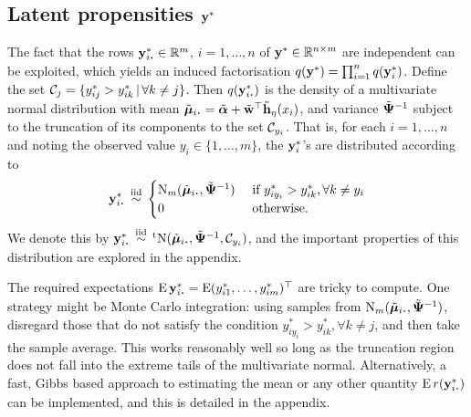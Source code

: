 \subsection{Latent propensities \texorpdfstring{${\mathbf y}^*$}{$y^*$}}

The fact that the rows $\by_{i \bigcdot}^* \in \bbR^m$, $i=1,\dots,n$ of ${\mathbf y}^* \in \mathbb{R}^{n \times m}$ are independent can be exploited, which yields an induced factorisation $q({\mathbf y}^*) = \prod_{i=1}^n q({\mathbf y}_i^*)$.
Define the set ${\mathcal C}_j = \{y_{ij}^* > y_{ik}^* \,|\, \forall k\neq j \}$.
Then $q(\by_{i \bigcdot}^*)$ is the density of a multivariate normal distribution with mean $\tilde\bmu_{i \bigcdot} = \tilde\balpha + \tilde\bw^\top \tilde \bh_\eta(x_i)$, and variance $\tilde {{\bm\Psi}}^{-1}$ subject to the truncation of its components to the set ${\mathcal C}_{y_i}$.
That is, for each $i=1,\dots,n$ and noting the observed value $y_i \in \{1,\dots,m\}$, the ${\mathbf y}_i^*$'s are distributed according to
\begin{align}\label{eq:ystardist}
  \by_{i \bigcdot}^* \iid
  \begin{cases}
    \N_m(\tilde\bmu_{i \bigcdot}, \tilde \bPsi^{-1}) & \text{ if } y_{iy_i}^* > y_{ik}^*, \forall k \neq y_i \\
    0 & \text{ otherwise}. \\
  \end{cases}
\end{align}
We denote this by $\by_{i \bigcdot}^* \iid \tN(\tilde\bmu_{i \bigcdot},\tilde \bPsi^{-1},\cC_{y_i})$, and the important properties of this distribution are explored in the appendix.

The required expectations $\E\by_{i \bigcdot}^* = \E (y_{i1}^*,\dots,y_{im}^*)^\top$ are tricky to compute.
One strategy might be Monte Carlo integration: using samples from $\N_m(\tilde\bmu_{i \bigcdot}, \tilde \bPsi^{-1})$, disregard those that do not satisfy the condition $y_{iy_i}^* > y_{ik}^*, \forall k \neq j$, and then take the sample average.
This works reasonably well so long as the truncation region does not fall into the extreme tails of the multivariate normal.
Alternatively, a fast, Gibbs based approach to estimating the mean or any other quantity $\E r(\by_{i \bigcdot}^*)$ can be implemented, and this is detailed in the appendix.

